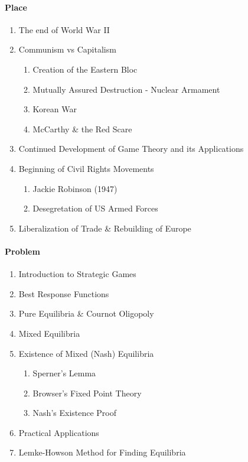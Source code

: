 \documentclass[11pt]{article}
\begin{document}
\paragraph{Place}
\begin{enumerate}
	\item The end of World War II
	\item Communism vs Capitalism
	\begin{enumerate}
		\item Creation of the Eastern Bloc
		\item Mutually Assured Destruction - Nuclear Armament
		\item Korean War
		\item McCarthy \& the Red Scare
	\end{enumerate}
	\item Continued Development of Game Theory and its Applications
	\item Beginning of Civil Rights Movements
	\begin{enumerate}
		\item Jackie Robinson (1947)
		\item Desegretation of US Armed Forces
	\end{enumerate}
	\item Liberalization of Trade \& Rebuilding of Europe
\end{enumerate}

\paragraph{Problem}
\begin{enumerate}
	\item Introduction to Strategic Games
	\item Best Response Functions
	\item Pure Equilibria \& Cournot Oligopoly
	\item Mixed Equilibria
	\item Existence of Mixed (Nash) Equilibria
	\begin{enumerate}
		\item Sperner's Lemma
		\item Browser's Fixed Point Theory
		\item Nash's Existence Proof
	\end{enumerate}
	\item Practical Applications
	\item Lemke-Howson Method for Finding Equilibria
\end{enumerate}
\end{document}

